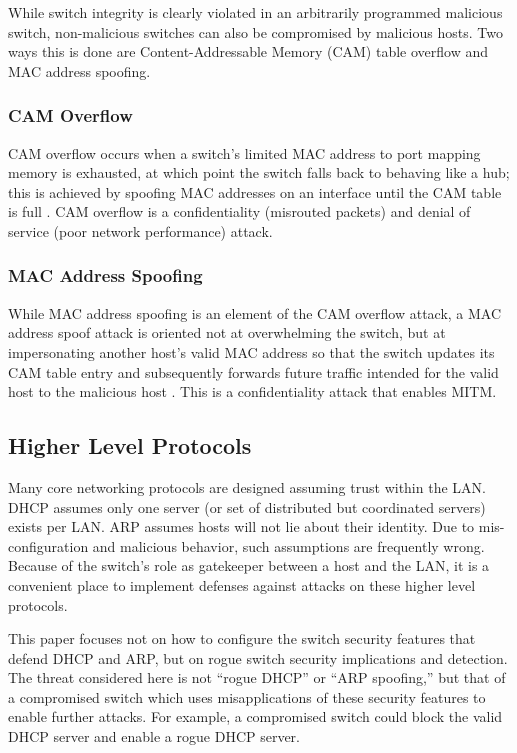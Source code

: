 \documentclass[journal]{IEEEtran}
\begin{document}
While switch integrity is clearly violated in an arbitrarily programmed malicious switch,
non-malicious switches can also be compromised by malicious hosts. Two ways this is done are
Content-Addressable Memory (CAM) table overflow and MAC address spoofing.

\subsubsection{CAM Overflow} CAM overflow occurs when a switch's limited MAC address to port mapping
memory is exhausted, at which point the switch falls back to behaving like a hub; this is achieved
by spoofing MAC addresses on an interface until the CAM table is full \cite{b1}. CAM overflow is a
confidentiality (misrouted packets) and denial of service (poor network performance) attack.

\subsubsection{MAC Address Spoofing} While MAC address spoofing is an element of the CAM overflow
attack, a MAC address spoof attack is oriented not at overwhelming the switch, but at impersonating
another host's valid MAC address so that the switch updates its CAM table entry and subsequently
forwards future traffic intended for the valid host to the malicious host \cite{b1}. This is a
confidentiality attack that enables MITM.

\subsection{Higher Level Protocols}
Many core networking protocols are designed assuming trust within the LAN. DHCP assumes only one
server (or set of distributed but coordinated servers) exists per LAN. ARP assumes hosts will not
lie about their identity. Due to mis-configuration and malicious behavior, such assumptions are
frequently wrong. Because of the switch's role as gatekeeper between a host and the LAN, it is a
convenient place to implement defenses against attacks on these higher level protocols.

This paper focuses not on how to configure the switch security features that defend DHCP and ARP,
but on rogue switch security implications and detection. The threat considered here is not ``rogue
DHCP'' or ``ARP spoofing,'' but that of a compromised switch which uses misapplications of these
security features to enable further attacks. For example, a compromised switch could block the valid
DHCP server and enable a rogue DHCP server.
\end{document}

